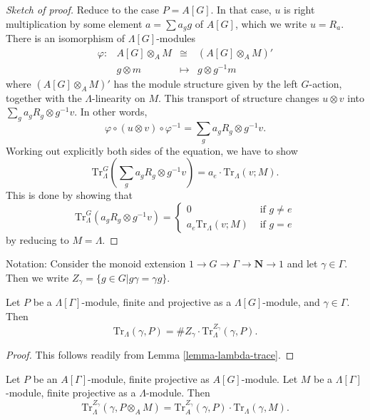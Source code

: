 \begin{proof}[Sketch of proof]
Reduce to the case $P=A[G]$. In that case, $u$ is right multiplication by some
element $a = \sum a_gg$ of $A[G]$, which we write $u = R_a$. There is an
isomorphism of $\Lambda[G]$-modules
$$
\begin{matrix}
\varphi : & A[G]\otimes_A M & \cong & \left(A[G]\otimes_A M\right)'\\
& g \otimes m & \longmapsto & g \otimes g^{-1}m
\end{matrix}
$$
where $\left(A[G]\otimes_A M\right)'$ has the module structure given by the
left $G$-action, together with the $\Lambda$-linearity on $M$. This transport
of structure changes $u \otimes v$ into $\sum_ga_gR_g \otimes g^{-1}v$. In other
words,
$$
\varphi \circ (u \otimes v) \circ \varphi^{-1}
=
\sum_ga_gR_g \otimes g^{-1}v.
$$
Working out explicitly both sides of the equation, we have to show
$$
\text{Tr}_\Lambda^G\left(\sum_g a_gR_g \otimes g^{-1}v\right) = a_e\cdot
\text{Tr}_\Lambda(v; M).
$$
This is done by showing that
$$
\text{Tr}_\Lambda^G\left(a_gR_g \otimes g^{-1}v\right) =
\left\{
\begin{matrix}
0 & \text{ if } g\neq e\\
a_e\text{Tr}_\Lambda\left(v; M\right) & \text{ if }g = e
\end{matrix}
\right.
$$
by reducing to $M=\Lambda$.
\end{proof}

\noindent
Notation:
Consider the monoid extension $1 \to G\to \Gamma\to \mathbf{N} \to 1$ and let
$\gamma\in \Gamma$.
Then we write $Z_\gamma = \{g\in G | g\gamma = \gamma g\}$.

\begin{lemma}
\label{lemma-gamma-z-gamma-trace}
Let $P$ be a $\Lambda[\Gamma]$-module, finite and projective as a
$\Lambda[G]$-module, and $\gamma \in \Gamma$. Then
$$
\text{Tr}_{\Lambda}(\gamma, P) =
\# Z_\gamma \cdot \text{Tr}_\Lambda^{Z_\gamma}\left(\gamma, P\right).
$$
\end{lemma}

\begin{proof}
This follows readily from Lemma \ref{lemma-lambda-trace}.
\end{proof}

\begin{lemma}
\label{lemma-weak-trace}
Let $P$ be an $A[\Gamma]$-module, finite projective as $A[G]$-module. Let $M$
be a $\Lambda[\Gamma]$-module, finite projective as a $\Lambda$-module. Then
$$
\text{Tr}_{\Lambda}^{Z_\gamma}(\gamma, P \otimes_A M) =
\text{Tr}_A^{Z_\gamma}(\gamma, P)\cdot \text{Tr}_\Lambda(\gamma, M).
$$
\end{lemma}

